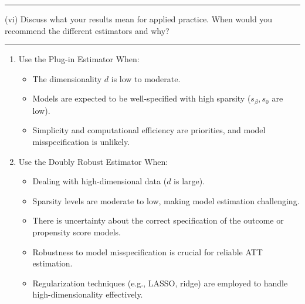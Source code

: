\documentclass{article}
\newenvironment{colorparagraph}[1]{\par\color{#1}}{\par}
\begin{document}
\begin{colorparagraph}{questioncolor}
  \rule{\textwidth}{0.5pt}
  
  \vspace{.2cm}
(vi) Discuss what your results mean for applied practice. When would you recommend the different estimators and why?

\rule{\textwidth}{0.5pt}
\end{colorparagraph}

\begin{enumerate}
      \item Use the Plug-in Estimator When:
        \begin{itemize}
          \item The dimensionality \( d \) is low to moderate.
          \item Models are expected to be well-specified with high sparsity (\( s_\beta, s_0 \) are low).
          \item Simplicity and computational efficiency are priorities, and model misspecification is unlikely.
        \end{itemize}
      \item Use the Doubly Robust Estimator When:
        \begin{itemize}
          \item Dealing with high-dimensional data (\( d \) is large).
          \item Sparsity levels are moderate to low, making model estimation challenging.
          \item There is uncertainty about the correct specification of the outcome or propensity score models.
          \item Robustness to model misspecification is crucial for reliable ATT estimation.
          \item Regularization techniques (e.g., LASSO, ridge) are employed to handle high-dimensionality effectively.
        \end{itemize}
\end{enumerate}
\end{document}
